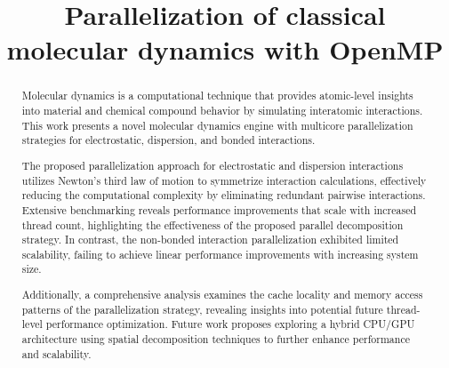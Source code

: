 \documentclass[conference]{IEEEtran}
\begin{document}
\title{Parallelization of classical molecular dynamics with OpenMP
\\
}
\author{
\and
{}
\and
{}
\and
{}
}

\maketitle
\thispagestyle{plain}


\begin{abstract}
Molecular
dynamics is a computational technique that provides atomic-level insights into material and chemical compound behavior
by simulating interatomic interactions. This work presents a novel molecular dynamics engine with multicore parallelization
strategies for electrostatic, dispersion, and bonded interactions. 

The proposed parallelization approach for electrostatic and dispersion interactions utilizes Newton's third law of 
motion to symmetrize interaction calculations, effectively reducing the computational complexity by eliminating 
redundant pairwise interactions. Extensive benchmarking reveals performance improvements that scale with increased
thread count, highlighting the effectiveness of the proposed parallel decomposition strategy.
In contrast, the non-bonded interaction parallelization exhibited limited scalability, failing to achieve linear 
performance improvements with increasing system size. 

Additionally, a comprehensive analysis examines the cache locality and memory access patterns of the parallelization 
strategy, revealing insights into potential future thread-level performance optimization. Future work proposes exploring a 
hybrid CPU/GPU architecture using spatial decomposition techniques to further enhance performance and scalability.

\end{abstract}
\end{document}
